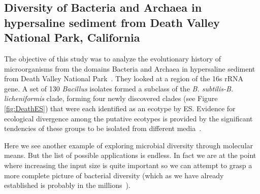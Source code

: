 \subsection*{Diversity of Bacteria and Archaea in hypersaline sediment from Death Valley National Park, California}
The objective of this study was to analyze the evolutionary history of microorganisms from the domains Bacteria and Archaea in hypersaline sediment from Death Valley National Park~\cite{kim2012diversity}. 
They looked at a region of the 16s rRNA gene.
A set of 130 \emph{Bacillus} isolates formed a subclass of the \emph{B. subtilis-B. licheniformis} clade, forming four newly discovered clades (see Figure \ref{fig:DeathES}) that were each identified as an ecotype by ES. Evidence for ecological divergence among the putative ecotypes is provided by the significant tendencies of these groups to be isolated from different media~\cite{kim2012diversity}.

Here we see another example of exploring microbial diversity through molecular means.
But the list of possible applications is endless.
In fact we are at the point where increasing the input size is quite important so we can attempt to grasp a more complete picture of bacterial diversity (which as we have already established is probably in the millions~\cite{cohan2008origins}).

